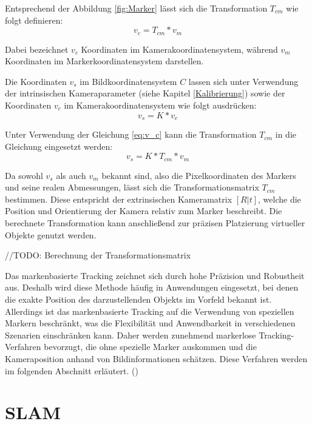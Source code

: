 Entsprechend der Abbildung \ref{fig:Marker} lässt sich die Transformation \( T_{cm} \) wie folgt definieren:
\begin{equation}\label{eq:v_c}
    v_c = T_{cm} * v_m
\end{equation}

Dabei bezeichnet \( v_c \) Koordinaten im Kamerakoordinatensystem, während \( v_m \) Koordinaten im Markerkoordinatensystem darstellen.  

Die Koordinaten \( v_s \) im Bildkoordinatensystem \( C \) lassen sich unter Verwendung der intrinsischen Kameraparameter (siehe Kapitel \ref{Kalibrierung}) sowie der Koordinaten \( v_c \) im Kamerakoordinatensystem wie folgt ausdrücken:
\begin{equation}
    v_s = K * v_c
\end{equation}

Unter Verwendung der Gleichung \ref{eq:v_c} kann die Transformation \( T_{cm} \) in die Gleichung eingesetzt werden:
\begin{equation}
    v_s = K * T_{cm} * v_m
\end{equation}

Da sowohl \( v_s \) als auch \( v_m \) bekannt sind, also die Pixelkoordinaten des Markers und seine realen Abmessungen, lässt sich die Transformationsmatrix \( T_{cm} \) bestimmen. Diese entspricht der extrinsischen Kameramatrix \( [R|t] \), welche die Position und Orientierung der Kamera relativ zum Marker beschreibt. Die berechnete Transformation kann anschließend zur präzisen Platzierung virtueller Objekte genutzt werden.

//TODO: Berechnung der Transformationsmatrix

Das markenbasierte Tracking zeichnet sich durch hohe Präzision und Robustheit aus. Deshalb wird diese Methode häufig in Anwendungen eingesetzt, bei denen die exakte Position des darzustellenden Objekts im Vorfeld bekannt ist. Allerdings ist das markenbasierte Tracking auf die Verwendung von speziellen Markern beschränkt, was die Flexibilität und Anwendbarkeit in verschiedenen Szenarien einschränken kann. Daher werden zunehmend markerlose Tracking-Verfahren bevorzugt, die ohne spezielle Marker auskommen und die Kameraposition anhand von Bildinformationen schätzen. Diese Verfahren werden im folgenden Abschnitt erläutert. (\cite{doerner2022virtual})

\section{SLAM}\label{SLAM}

